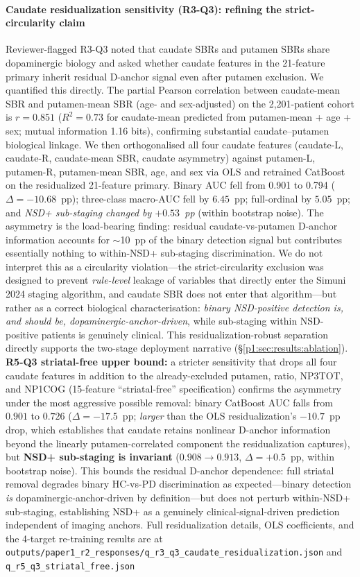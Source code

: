 \paragraph*{Caudate residualization sensitivity (R3-Q3): refining the strict-circularity claim} Reviewer-flagged R3-Q3 noted that caudate SBRs and putamen SBRs share dopaminergic biology and asked whether caudate features in the 21-feature primary inherit residual D-anchor signal even after putamen exclusion. We quantified this directly. The partial Pearson correlation between caudate-mean SBR and putamen-mean SBR (age- and sex-adjusted) on the 2{,}201-patient cohort is $r{=}0.851$ ($R^2{=}0.73$ for caudate-mean predicted from putamen-mean + age + sex; mutual information 1.16 bits), confirming substantial caudate--putamen biological linkage. We then orthogonalised all four caudate features (caudate-L, caudate-R, caudate-mean SBR, caudate asymmetry) against putamen-L, putamen-R, putamen-mean SBR, age, and sex via OLS and retrained CatBoost on the residualized 21-feature primary. Binary AUC fell from 0.901 to 0.794 ($\Delta{=}{-}10.68$~pp); three-class macro-AUC fell by $6.45$~pp; full-ordinal by $5.05$~pp; and \emph{NSD+ sub-staging changed by ${+}0.53$~pp} (within bootstrap noise). The asymmetry is the load-bearing finding: residual caudate-vs-putamen D-anchor information accounts for $\sim$10~pp of the binary detection signal but contributes essentially nothing to within-NSD+ sub-staging discrimination. We do not interpret this as a circularity violation---the strict-circularity exclusion was designed to prevent \emph{rule-level} leakage of variables that directly enter the Simuni 2024 staging algorithm, and caudate SBR does not enter that algorithm---but rather as a correct biological characterisation: \emph{binary NSD-positive detection is, and should be, dopaminergic-anchor-driven}, while sub-staging within NSD-positive patients is genuinely clinical. This residualization-robust separation directly supports the two-stage deployment narrative (\S\ref{p1:sec:results:ablation}). \textbf{R5-Q3 striatal-free upper bound:} a stricter sensitivity that drops all four caudate features in addition to the already-excluded putamen, ratio, NP3TOT, and NP1COG (15-feature ``striatal-free'' specification) confirms the asymmetry under the most aggressive possible removal: binary CatBoost AUC falls from $0.901$ to $0.726$ ($\Delta{=}{-}17.5$~pp; \emph{larger} than the OLS residualization's $-10.7$~pp drop, which establishes that caudate retains nonlinear D-anchor information beyond the linearly putamen-correlated component the residualization captures), but \textbf{NSD+ sub-staging is invariant} ($0.908 \rightarrow 0.913$, $\Delta{=}{+}0.5$~pp, within bootstrap noise). This bounds the residual D-anchor dependence: full striatal removal degrades binary HC-vs-PD discrimination as expected---binary detection \emph{is} dopaminergic-anchor-driven by definition---but does not perturb within-NSD+ sub-staging, establishing NSD+ as a genuinely clinical-signal-driven prediction independent of imaging anchors. Full residualization details, OLS coefficients, and the 4-target re-training results are at \texttt{outputs/paper1\_r2\_responses/q\_r3\_q3\_caudate\_residualization.json} and \texttt{q\_r5\_q3\_striatal\_free.json} 